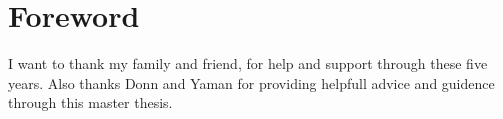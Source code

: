 \chapter{Foreword}

I want to thank my family and friend, for help and support through these five years. Also thanks Donn and Yaman for providing helpfull advice and guidence through this master thesis. 